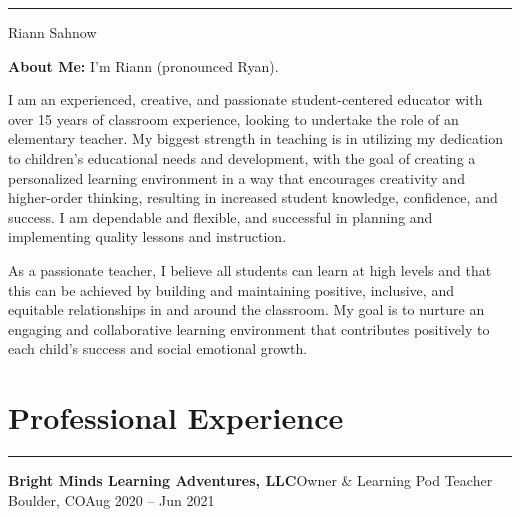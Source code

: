 \documentclass[letterpaper,10pt]{article}
\newcommand{\mblue}{\color{darkblue}}
\begin{document}
\pagestyle{empty}

{\mblue\rule{4.63in}{0.08cm}}

\vspace{-1.0pc}
\hfill{\Huge\mblue Riann Sahnow}

\vspace{2pc}

\textbf{About Me:} I'm Riann (pronounced Ryan).

\vspace{1pc}\qquad\qquad I am an experienced, creative, and passionate student-centered educator with over 15 years of classroom experience, looking to undertake the role of an elementary teacher.
My biggest strength in teaching is in utilizing my dedication to children's educational needs and development, with the goal of creating a personalized learning environment in a way that encourages creativity
and higher-order thinking, resulting in increased student knowledge, confidence, and success.
I am dependable and flexible, and successful in planning and implementing quality lessons and instruction.

\vspace{1pc}\qquad\qquad As a passionate teacher, I believe all students can learn at high levels and that this can be achieved by building and maintaining positive, inclusive, and
equitable relationships in and around the classroom. My goal is to nurture an engaging and collaborative learning environment that contributes positively to each child's success and
social emotional growth.

\section*{\mblue Professional Experience}

\vspace{-2.15pc}
{\hfill\mblue\rule{4.615in}{0.02cm}}

\vspace{1pc}
\textbf{Bright Minds Learning Adventures, LLC}\hfill Owner \& Learning Pod Teacher
\smallbreak Boulder, CO\hfill Aug 2020 -- Jun 2021
\end{document}
